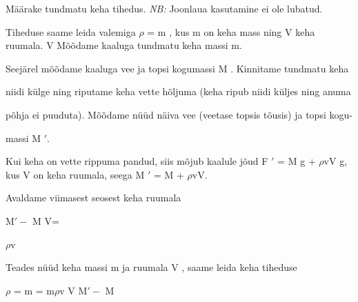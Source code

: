 
Määrake tundmatu keha tihedus.
\textit{NB:} Joonlaua kasutamine ei ole lubatud.

\hint

\solu
Tiheduse saame leida valemiga $\rho$ = m , kus m on keha mass ning V keha ruumala. V Mõõdame kaaluga tundmatu keha massi m.

Seejärel mõõdame kaaluga vee ja topsi kogumassi M . Kinnitame tundmatu keha

niidi külge ning riputame keha vette hõljuma (keha ripub niidi küljes ning anuma

põhja ei puuduta). Mõõdame nüüd näiva vee (veetase topsis tõusis) ja topsi kogu-

massi M $'$.

Kui keha on vette rippuma pandud, siis mõjub kaalule jõud F $'$ = M g + $\rho$vV g, kus V on keha ruumala, seega M $'$ = M + $\rho$vV.

Avaldame viimasest seosest keha ruumala

M$' -$ M V=

$\rho$v

Teades nüüd keha massi m ja ruumala V , saame leida keha tiheduse

$\rho$ = m = m$\rho$v V M$' -$ M
\probend
